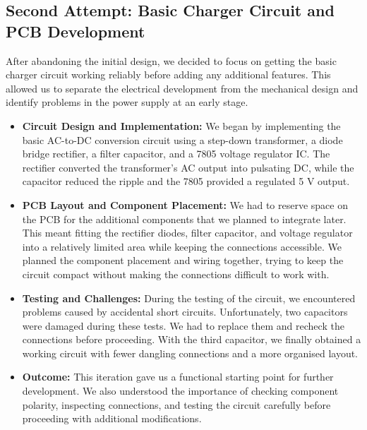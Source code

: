 \documentclass[12pt,a4paper]{article}
\numberwithin{figure}{section}
\begin{document}
\subsection{Second Attempt: Basic Charger Circuit and PCB Development}

After abandoning the initial design, we decided to focus on getting the basic charger circuit working reliably before adding any additional features. This allowed us to separate the electrical development from the mechanical design and identify problems in the power supply at an early stage.

\begin{itemize}
    \item \textbf{Circuit Design and Implementation:} We began by implementing the basic AC-to-DC conversion circuit using a step-down transformer, a diode bridge rectifier, a filter capacitor, and a 7805 voltage regulator IC. The rectifier converted the transformer's AC output into pulsating DC, while the capacitor reduced the ripple and the 7805 provided a regulated 5 V output.

    \item \textbf{PCB Layout and Component Placement:} We had to reserve space on the PCB for the additional components that we planned to integrate later. This meant fitting the rectifier diodes, filter capacitor, and voltage regulator into a relatively limited area while keeping the connections accessible. We planned the component placement and wiring together, trying to keep the circuit compact without making the connections difficult to work with.

    \item \textbf{Testing and Challenges:} During the testing of the circuit, we encountered problems caused by accidental short circuits. Unfortunately, two capacitors were damaged during these tests. We had to replace them and recheck the connections before proceeding. With the third capacitor, we finally obtained a working circuit with fewer dangling connections and a more organised layout.

    \item \textbf{Outcome:} This iteration gave us a functional starting point for further development. We also understood the importance of checking component polarity, inspecting connections, and testing the circuit carefully before proceeding with additional modifications.
\end{itemize}

\end{document}
